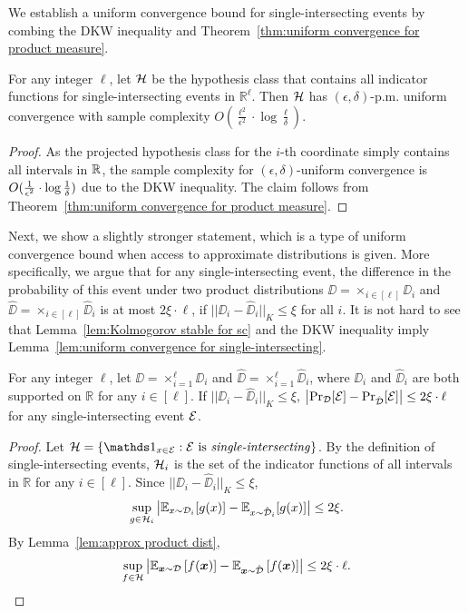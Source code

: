 \noindent We establish a uniform convergence bound for single-intersecting events by combing the DKW inequality and Theorem~\ref{thm:uniform convergence for product measure}.

\begin{lemma}\label{lem:uniform convergence for single-intersecting}
	For any integer $\ell$, let ${\mathcal{H}}$ be the hypothesis class that contains all indicator functions for single-intersecting events in $\mathbb{R}^\ell$. Then ${\mathcal{H}}$ has $(\epsilon,\delta)$-p.m. uniform convergence with sample complexity $O\left(\frac{\ell^2}{\epsilon^2}\cdot \log \frac{\ell}{\delta}\right)$.
\end{lemma}
\begin{proof}
	As the projected hypothesis class for the $i$-th coordinate simply contains all intervals in $\mathbb{R}$, the sample complexity for $(\epsilon,\delta)$-uniform convergence is $O({1 \over \epsilon^2}\cdot \log \frac{1}{\delta})$ due to the DKW inequality. The claim follows from Theorem~\ref{thm:uniform convergence for product measure}.
\end{proof}

Next, we show a slightly stronger statement, which is a type of uniform convergence bound when access to approximate distributions is given. More specifically, we argue that for any single-intersecting event, the difference in the probability of this event under two product distributions $\DD=\times_{i\in[\ell]}\DD_i$ and $\hat{\DD}=\times_{i\in[\ell]}\hat{\DD}_{i}$ is at most $2\xi\cdot \ell$, if $||\DD_i-\hat{\DD}_i||_K\leq \xi$ for all $i$. It is not hard to see that Lemma~\ref{lem:Kolmogorov stable for sc} and the DKW inequality imply Lemma~\ref{lem:uniform convergence for single-intersecting}.

\begin{lemma}\label{lem:Kolmogorov stable for sc}
For any integer $\ell$, let $\DD=\times_{i=1}^\ell \DD_i$ and $\hat{\DD}=\times_{i=1}^\ell \hat{\DD}_i$, where $\DD_i$ and $\hat{\DD}_i$ are both supported on $\mathbb{R}$ for any $i\in[\ell]$. If $||\DD_i-\hat{\DD}_i||_K\leq \xi$, $\left|\Pr_{\mathcal{D}}[{\mathcal{E}}]-\Pr_{\hat{{\mathcal{D}}}}[{\mathcal{E}}]\right|\leq 2\xi\cdot \ell$ for any single-intersecting event ${\mathcal{E}}$.
\end{lemma}
\begin{proof}
	Let $\HH=\left\{\ind_{x\in \EE} :\EE\text{ is \emph{single-intersecting}}\right\}$. By the definition of single-intersecting events, ${\mathcal{H}}_i$ is the set of the indicator functions of all intervals in $\mathbb{R}$ for any $i\in [\ell]$. Since $||\DD_i-\hat{\DD}_i||_K\leq \xi$, $$\sup_{g\in{\mathcal{H}}_i}\left|{\mathbb{E}}_{x\sim {\mathcal{D}}_i}[g(x)]-{\mathbb{E}}_{x\sim \hat{{\mathcal{D}}}_i}[g(x)]\right|\leq 2\xi.$$ By Lemma~\ref{lem:approx product dist}, $$\sup_{f\in{\mathcal{H}}} \left|{\mathbb{E}}_{\boldsymbol{x}\sim {\mathcal{D}}}\left[f(\boldsymbol{x})\right]-{\mathbb{E}}_{\boldsymbol{x}\sim \hat{{\mathcal{D}}}}\left[f(\boldsymbol{x})\right]\right|\leq 2\xi\cdot \ell.$$
\end{proof}

